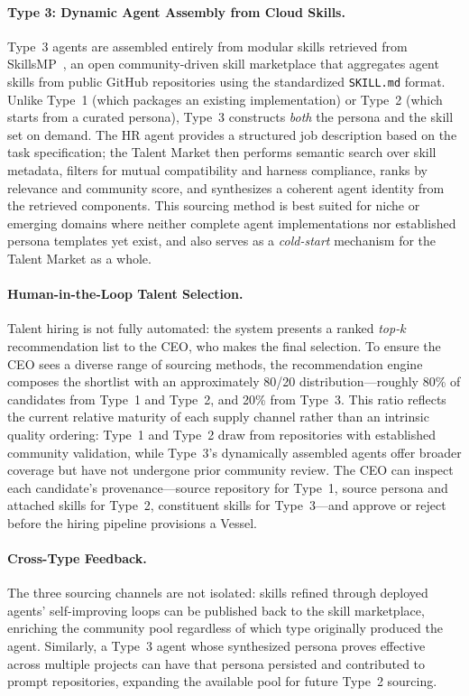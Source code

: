 \paragraph{Type 3: Dynamic Agent Assembly from Cloud Skills.}
Type~3 agents are assembled entirely from modular skills retrieved from SkillsMP~\cite{skillsmp}, an open community-driven skill marketplace that aggregates agent skills from public GitHub repositories using the standardized \texttt{SKILL.md} format. Unlike Type~1 (which packages an existing implementation) or Type~2 (which starts from a curated persona), Type~3 constructs \emph{both} the persona and the skill set on demand. The HR agent provides a structured job description based on the task specification; the Talent Market then performs semantic search over skill metadata, filters for mutual compatibility and harness compliance, ranks by relevance and community score, and synthesizes a coherent agent identity from the retrieved components. This sourcing method is best suited for niche or emerging domains where neither complete agent implementations nor established persona templates yet exist, and also serves as a \emph{cold-start} mechanism for the Talent Market as a whole.

\paragraph{Human-in-the-Loop Talent Selection.}
Talent hiring is not fully automated: the system presents a ranked \emph{top-$k$} recommendation list to the CEO, who makes the final selection. To ensure the CEO sees a diverse range of sourcing methods, the recommendation engine composes the shortlist with an approximately 80/20 distribution---roughly 80\% of candidates from Type~1 and Type~2, and 20\% from Type~3. This ratio reflects the current relative maturity of each supply channel rather than an intrinsic quality ordering: Type~1 and Type~2 draw from repositories with established community validation, while Type~3’s dynamically assembled agents offer broader coverage but have not undergone prior community review. The CEO can inspect each candidate’s provenance---source repository for Type~1, source persona and attached skills for Type~2, constituent skills for Type~3---and approve or reject before the hiring pipeline provisions a Vessel.

\paragraph{Cross-Type Feedback.}
The three sourcing channels are not isolated: skills refined through deployed agents’ self-improving loops can be published back to the skill marketplace, enriching the community pool regardless of which type originally produced the agent. Similarly, a Type~3 agent whose synthesized persona proves effective across multiple projects can have that persona persisted and contributed to prompt repositories, expanding the available pool for future Type~2 sourcing.


